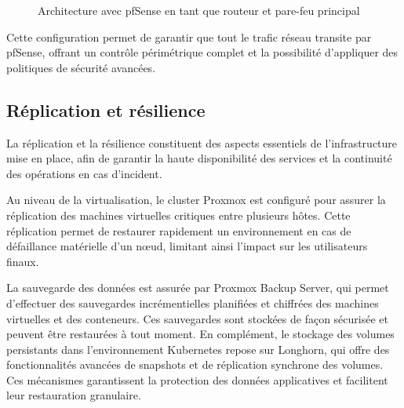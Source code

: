 \begin{figure}[H]
	\centering
	\caption{Architecture avec pfSense en tant que routeur et pare-feu principal}
\end{figure}

Cette configuration permet de garantir que tout le trafic réseau transite par pfSense, offrant un contrôle périmétrique complet et la possibilité d’appliquer des politiques de sécurité avancées.

\subsection{Réplication et résilience}

La réplication et la résilience constituent des aspects essentiels de l’infrastructure mise en place, afin de garantir la haute disponibilité des services et la continuité des opérations en cas d’incident.

Au niveau de la virtualisation, le cluster Proxmox est configuré pour assurer la réplication des machines virtuelles critiques entre plusieurs hôtes. Cette réplication permet de restaurer rapidement un environnement en cas de défaillance matérielle d’un nœud, limitant ainsi l’impact sur les utilisateurs finaux.

La sauvegarde des données est assurée par Proxmox Backup Server, qui permet d’effectuer des sauvegardes incrémentielles planifiées et chiffrées des machines virtuelles et des conteneurs. Ces sauvegardes sont stockées de façon sécurisée et peuvent être restaurées à tout moment. En complément, le stockage des volumes persistants dans l’environnement Kubernetes repose sur Longhorn, qui offre des fonctionnalités avancées de snapshots et de réplication synchrone des volumes. Ces mécanismes garantissent la protection des données applicatives et facilitent leur restauration granulaire.

